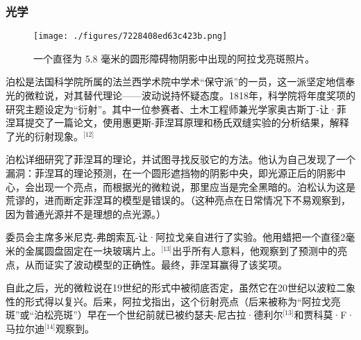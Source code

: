 \subsubsection{光学}
\begin{figure}[ht]
\centering
\texttt{[image: ./figures/7228408ed63c423b.png]}
\caption{一个直径为 5.8 毫米的圆形障碍物阴影中出现的阿拉戈亮斑照片。} \label{fig_BSDN_3}
\end{figure}
泊松是法国科学院所属的法兰西学术院中学术“保守派”的一员，这一派坚定地信奉光的微粒说，对其替代理论——波动说持怀疑态度。1818年，科学院将年度奖项的研究主题设定为“衍射”。其中一位参赛者、土木工程师兼光学家奥古斯丁-让·菲涅耳提交了一篇论文，使用惠更斯-菲涅耳原理和杨氏双缝实验的分析结果，解释了光的衍射现象。\(^\text{[12]}\)

泊松详细研究了菲涅耳的理论，并试图寻找反驳它的方法。他认为自己发现了一个漏洞：菲涅耳的理论预测，在一个圆形遮挡物的阴影中央，即光源正后的阴影中心，会出现一个亮点，而根据光的微粒说，那里应当是完全黑暗的。泊松认为这是荒谬的，进而断定菲涅耳的模型是错误的。（这种亮点在日常情况下不易观察到，因为普通光源并不是理想的点光源。）

委员会主席多米尼克-弗朗索瓦-让·阿拉戈亲自进行了实验。他用蜡把一个直径2毫米的金属圆盘固定在一块玻璃片上。\(^\text{[13]}\)出乎所有人意料，他观察到了预测中的亮点，从而证实了波动模型的正确性。最终，菲涅耳赢得了该奖项。

自此之后，光的微粒说在19世纪的形式中被彻底否定，虽然它在20世纪以波粒二象性的形式得以复兴。后来，阿拉戈指出，这个衍射亮点（后来被称为“阿拉戈亮斑”或“泊松亮斑”）早在一个世纪前就已被约瑟夫-尼古拉·德利尔\(^\text{[13]}\)和贾科莫·F·马拉尔迪\(^\text{[14]}\)观察到。
